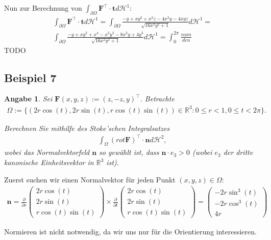 \documentclass[]{article}
\newtheorem*{angabe*}{Angabe}
\begin{document}
Nun zur Berechnung von $\int_{\partial\Omega} \bm{F}^\top \cdot \bm{t} d\mathcal{H}^1$:
\begin{align*}
	\int_{\partial\Omega} \bm{F}^\top \cdot \bm{t} d\mathcal{H}^1 = \int_{\partial\Omega} \frac{-y + xy^2 + x^2z - 4x^2y - 4xyz}{\sqrt{16x^2y^2+1}} d\mathcal{H}^1 =\\
	\int_{\partial\Omega} \frac{-y+xy^2+x^4-x^2y^2-8x^2y+4y^3}{\sqrt{16x^2y^2+1}} d\mathcal{H}^1 = \int_0^{2\pi} \frac{num}{den}
\end{align*}
TODO
\newpage
 
\subsection*{Beispiel 7}
\begin{angabe*}
	Sei $\bm{F}(x,y,z):=(z, -z, y)^\top$. Betrachte
	\begin{align*}
		\Omega := \{(2r\cos(t), 2r\sin(t), r\cos(t)\sin(t))\in \mathbb{R}^3: 0 \leq r < 1, 0 \leq t < 2\pi\}.
	\end{align*}
	
	Berechnen Sie mithilfe des Stoke'schen Integralsatzes
	\begin{align*}
		\int_\Omega (rot \bm{F})^\top \cdot \bm{n} d\mathcal{H}^2,
	\end{align*}
	wobei das Normalvektorfeld $\bm{n}$ so gewählt ist, dass $\bm{n}\cdot e_3 > 0$ (wobei $e_3$ der dritte kanonische Einheitsvektor in $\mathbb{R}^3$ ist).
\end{angabe*}

Zuerst suchen wir einen Normalvektor für jeden Punkt $(x,y,z)\in \Omega$:
\begin{align*}
	\bm{n} = \frac{\partial}{\partial r}\begin{pmatrix} 2r\cos(t)\\ 2r\sin(t)\\ r\cos(t)\sin(t) \end{pmatrix} \times \frac{\partial}{\partial t}\begin{pmatrix}
	2r\cos(t)\\ 2r\sin(t)\\ r\cos(t)\sin(t) \end{pmatrix} = \begin{pmatrix}
	-2r\sin^3(t)\\ -2r\cos^3(t)\\ 4r \end{pmatrix}
\end{align*}

Normieren ist nicht notwendig, da wir uns nur für die Orientierung interessieren. 
\end{document}

